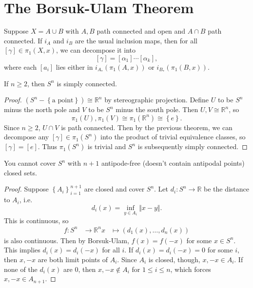 \documentclass[twoside,10pt]{report}
\begin{document}

\section{The Borsuk-Ulam Theorem}

\begin{thrm}[]
	Suppose $X=A \cup B$ with $A,B$ path connected and open and $A \cap B$ path connected. If $i_{A}$ and $i_{B}$ are the usual inclusion maps, then for all $[\gamma] \in \pi_1(X,x)$, we can decompose it into
	\[
		[\gamma] = [\alpha_1] \cdots [\alpha_{k}],
	\] where each $[a_i]$ lies either in $i_{A_*}(\pi_1(A,x))$ or $i_{B_{*}}(\pi_1(B,x))$.
\end{thrm}

\begin{cor}
If $n \geq 2$, then $S^{n}$ is simply connected.
\end{cor}
\begin{proof}
	$(S^{n}-\left\{ \text{a point} \right\}) \cong \mathbb{R}^{n}$ by stereographic projection. Define $U$ to be $S^{n}$ minus the north pole and $V$ to be $S^{n}$ minus the south pole. Then $U,V \cong \mathbb{R}^{n}$, so
	\[
		\pi_1(U), \pi_1(V) \cong \pi_1(\mathbb{R}^{n}) \cong \left\{ e \right\}.
	\] Since $n \geq 2$, $U \cap V$ is path connected. Then by the previous theorem, we can decompose any $[\gamma] \in \pi_1(S^{n})$ into the product of trivial equivalence classes, so $[\gamma]=[e]$. Thus $\pi_1(S^{n})$ is trivial and $S^{n}$ is subsequently simply connected.
\end{proof}

\begin{cor}
	You cannot cover $S^{n}$ with $n+1$ antipode-free (doesn't contain antipodal points) closed sets.
\end{cor}
\begin{proof}
	Suppose $\left\{ A_i \right\}_{i=1}^{n+1}$ are closed and cover $S^{n}$. Let $d_i:S^{n}\to \mathbb{R}$ be the distance to $A_{i}$, i.e.
	\[
		d_i(x) = \inf_{y \in A_{i}}{\Vert{x-y}\Vert}.
	\] This is continuous, so
	\begin{align*}
		f:S^{n}&\to \mathbb{R}^{n}
		x&\mapsto (d_1(x), \dots, d_{n}(x))
	\end{align*}
	is also continuous. Then by Borsuk-Ulam, $f(x)=f(-x)$ for some $x \in S^{n}$. This implies $d_{i}(x)=d_{i}(-x)$ for all $i$. If $d_i(x)=d_i(-x)=0$ for some $i$, then $x,-x$ are both limit points of $A_i$. Since $A_i$ is closed, though, $x,-x \in A_i$. If none of the $d_i(x)$ are 0, then $x,-x \not\in A_i$ for $1 \leq i \leq n$, which forces $x,-x \in A_{n+1}$.
\end{proof}
\end{document}
